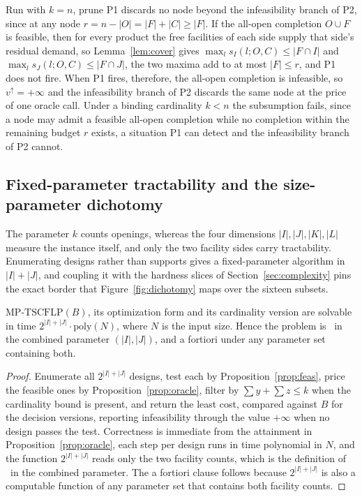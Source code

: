 \begin{observation}
\label{obs:p1redundant}
Run with $k=n$, prune P1 discards no node beyond the infeasibility
branch of P2, since at any node $r=n-|O|=|F|+|C|\ge|F|$. If the
all-open
completion $O\cup F$ is feasible, then for every product the free
facilities of each side supply that side's residual demand, so
Lemma~\ref{lem:cover} gives $\max_l s_I(l;O,C)\le|F\cap I|$ and
$\max_l s_J(l;O,C)\le|F\cap J|$, the two maxima add to at most
$|F|\le r$, and P1 does not fire. When P1 fires, therefore, the
all-open completion is infeasible, so $v^{\uparrow}=+\infty$ and the
infeasibility branch of P2 discards the same node at the price of one
oracle call. Under a binding cardinality $k<n$ the subsumption fails,
since a node may admit a feasible all-open completion while no
completion within the remaining budget $r$ exists, a situation P1 can detect
and the infeasibility branch of P2 cannot.
\end{observation}

\subsection{Fixed-parameter tractability and the size-parameter
dichotomy}\label{sec:fpt}

The parameter $k$ counts openings, whereas the four dimensions
$|I|,|J|,|K|,|L|$ measure the instance itself, and only the two facility
sides carry tractability. Enumerating designs rather than supports gives a
fixed-parameter algorithm in $|I|+|J|$, and coupling it with the hardness
slices of Section~\ref{sec:complexity} pins the exact border that
Figure~\ref{fig:dichotomy} maps over the sixteen subsets.



\begin{theorem}\label{thm:fpt}
$\mathrm{MP\text{-}TSCFLP}(B)$, its optimization form and its cardinality
version are solvable in time $2^{|I|+|J|}\cdot\mathrm{poly}(N)$, where $N$
is the input size. Hence the problem is \FPT\ in the combined parameter
$(|I|,|J|)$, and a fortiori under any parameter set containing both.
\end{theorem}
\begin{proof}
Enumerate all $2^{|I|+|J|}$ designs, test each by
Proposition~\ref{prop:feas}, price the feasible ones by
Proposition~\ref{prop:oracle}, filter by $\sum y+\sum z\le k$ when the
cardinality bound is present, and return the least cost, compared
against $B$ for the decision versions, reporting infeasibility through
the value $+\infty$ when no design passes the test. Correctness is immediate from the
attainment in Proposition~\ref{prop:oracle}, each step per design runs
in time polynomial in $N$, and the function $2^{|I|+|J|}$ reads only the
two facility counts, which is the definition of \FPT\ in the combined
parameter. The a fortiori clause follows because $2^{|I|+|J|}$ is also a
computable function of any parameter set that contains both facility
counts.
\end{proof}

